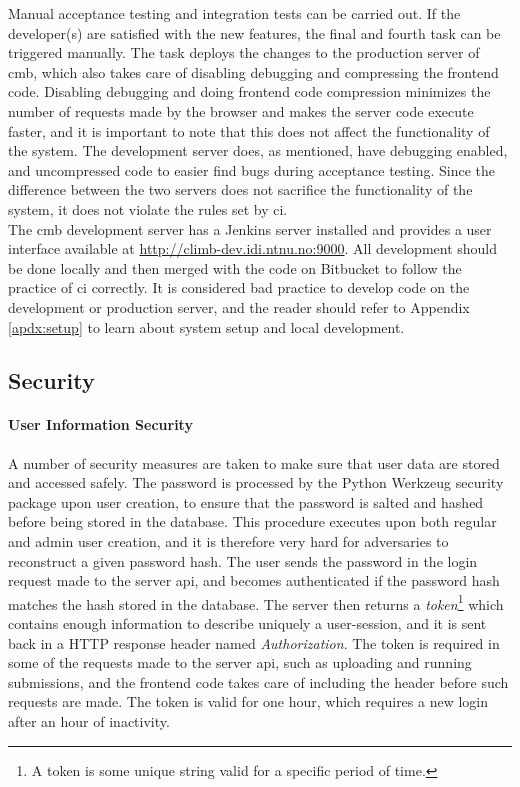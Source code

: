 Manual acceptance testing and integration tests can be carried out. If the developer(s) are satisfied with the new features, the final and fourth task can be triggered manually. The task deploys the changes to the production server of \gls{cmb}, which also takes care of disabling debugging and compressing the frontend code. Disabling debugging and doing frontend code compression minimizes the number of requests made by the browser and makes the server code execute faster, and it is important to note that this does not affect the functionality of the system. The development server does, as mentioned, have debugging enabled, and uncompressed code to easier find bugs during acceptance testing. Since the difference between the two servers does not sacrifice the functionality of the system, it does not violate the rules set by \gls{ci}.  \\

The \gls{cmb} development server has a Jenkins server installed and provides a user interface available at \url{http://climb-dev.idi.ntnu.no:9000}. All development should be done locally and then merged with the code on Bitbucket to follow the practice of \gls{ci} correctly. It is considered bad practice to develop code on the development or production server, and the reader should refer to Appendix \ref{apdx:setup} to learn about system setup and local development.

\subsection{Security}

\paragraph*{User Information Security} A number of security measures are taken to make sure that user data are stored and accessed safely. The password is processed by the Python Werkzeug security package \cite{WERKZEUG} upon user creation, to ensure that the password is salted and hashed before being stored in the database. This procedure executes upon both regular and admin user creation, and it is therefore very hard for adversaries to reconstruct a given password hash. The user sends the password in the login request made to the server \gls{api}, and becomes authenticated if the password hash matches the hash stored in the database. The server then returns a \textit{token}\footnote{A token is some unique string valid for a specific period of time.} which contains enough information to describe uniquely a user-session, and it is sent back in a HTTP response header named \textit{Authorization}. The token is required in some of the requests made to the server \gls{api}, such as uploading and running submissions, and the frontend code takes care of including the header before such requests are made. The token is valid for one hour, which requires a new login after an hour of inactivity. \\

